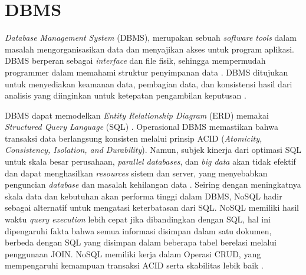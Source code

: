 \section{DBMS}
\textit{Database Management System} (DBMS), merupakan sebuah \textit{software tools} dalam masalah mengorganisasikan data dan menyajikan akses untuk program aplikasi. DBMS berperan sebagai \textit{interface} dan file fisik, sehingga mempermudah programmer dalam memahami struktur penyimpanan data \parencite{susanto2019}. DBMS ditujukan untuk menyediakan keamanan data, pembagian data, dan konsistensi hasil dari analisis yang diinginkan untuk ketepatan pengambilan keputusan \parencite{sabrina2023}.

DBMS dapat memodelkan \textit{Entity Relationship Diagram} (ERD) memakai \textit{Structured Query Language} (SQL) \parencite{hoffman2001}. Operasional DBMS memastikan bahwa transaksi data berlangsung konsisten melalui prinsip ACID (\textit{Atomicity, Consistency, Isolation, and Durability}). Namun, subjek kinerja dari optimasi SQL untuk skala besar perusahaan, \textit{parallel databases}, dan \textit{big data} akan tidak efektif dan dapat menghasilkan \textit{resources} sistem dan server, yang menyebabkan penguncian \textit{database} dan masalah kehilangan data \parencite{khan2022}. Seiring dengan meningkatnya skala data dan kebutuhan akan performa tinggi dalam DBMS, NoSQL hadir sebagai alternatif untuk mengatasi keterbatasan dari SQL. NoSQL memiliki hasil waktu \textit{query execution} lebih cepat jika dibandingkan dengan SQL, hal ini dipengaruhi fakta bahwa semua informasi disimpan dalam satu dokumen, berbeda dengan SQL yang disimpan dalam beberapa tabel berelasi melalui penggunaan JOIN. NoSQL memiliki kerja dalam Operasi CRUD, yang mempengaruhi kemampuan transaksi ACID serta skabilitas lebik baik \parencite{rade2022}.

